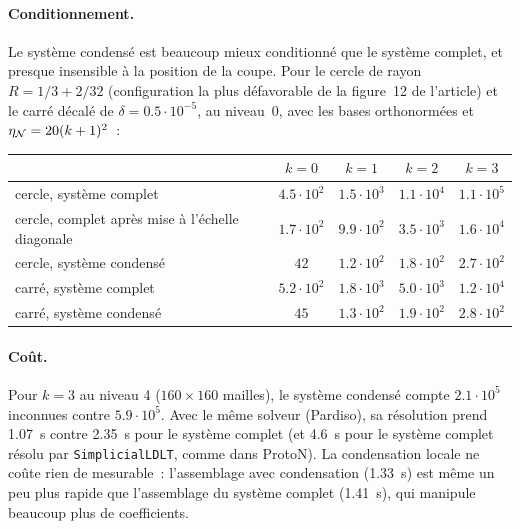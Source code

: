\documentclass[11pt,a4paper]{article}
\theoremstyle{definition}
\theoremstyle{remark}
\begin{document}
\paragraph{Conditionnement.} Le système condensé est beaucoup mieux conditionné que le système complet,
et presque insensible à la position de la coupe. Pour le cercle de rayon $R=1/3+2/32$ (configuration
la plus défavorable de la figure~12 de l'article) et le carré décalé de $\delta=0.5\cdot10^{-5}$, au
niveau~0, avec les bases orthonormées et $\eta_{\mathcal{N}}=20(k+1)^2$~:
\begin{center}
\begin{tabular}{lcccc}
\toprule
& $k=0$ & $k=1$ & $k=2$ & $k=3$ \\
\midrule
cercle, système complet & $4.5\cdot10^{2}$ & $1.5\cdot10^{3}$ & $1.1\cdot10^{4}$ & $1.1\cdot10^{5}$ \\
cercle, complet après mise à l'échelle diagonale & $1.7\cdot10^{2}$ & $9.9\cdot10^{2}$ & $3.5\cdot10^{3}$ & $1.6\cdot10^{4}$ \\
cercle, système condensé & $42$ & $1.2\cdot10^{2}$ & $1.8\cdot10^{2}$ & $2.7\cdot10^{2}$ \\
\midrule
carré, système complet & $5.2\cdot10^{2}$ & $1.8\cdot10^{3}$ & $5.0\cdot10^{3}$ & $1.2\cdot10^{4}$ \\
carré, système condensé & $45$ & $1.3\cdot10^{2}$ & $1.9\cdot10^{2}$ & $2.8\cdot10^{2}$ \\
\bottomrule
\end{tabular}
\end{center}

\paragraph{Coût.} Pour $k=3$ au niveau 4 ($160\times160$ mailles), le système condensé compte
$2.1\cdot10^{5}$ inconnues contre $5.9\cdot10^{5}$. Avec le même solveur (Pardiso), sa
résolution prend 1.07~s contre 2.35~s pour le système complet (et 4.6~s pour le système complet
résolu par \texttt{SimplicialLDLT}, comme dans ProtoN). La condensation locale ne coûte rien de
mesurable~: l'assemblage avec condensation (1.33~s) est même un peu plus rapide que l'assemblage du
système complet (1.41~s), qui manipule beaucoup plus de coefficients.
\end{document}
